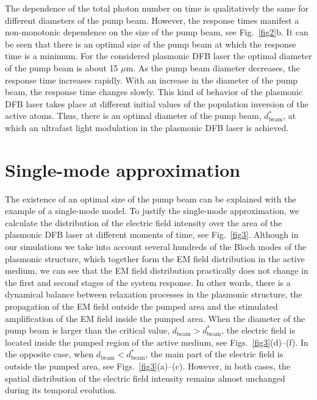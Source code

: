 \documentclass[aps,pra,amsmath,amssymb,onecolumn,superscriptaddress,showpacs,floatfix,]{revtex4-1}
\begin{document}
The dependence of the total photon number on time is qualitatively the same for different diameters of the pump beam.
However, the response times manifest a non-monotonic dependence on the size of the pump beam, see Fig.~\ref{fig2}b.
It can be seen that there is an optimal size of the pump beam at which the response time is a minimum.
For the considered plasmonic DFB laser the optimal diameter of the pump beam is about 15 $\mu$m.
As the pump beam diameter decreases, the response time increases rapidly.
With an increase in the diameter of the pump beam, the response time changes slowly.
This kind of behavior of the plasmonic DFB laser takes place at different initial values of the population inversion of the active atoms.
Thus, there is an optimal diameter of the pump beam, $d_{\text{beam}}^*$, at which an ultrafast light modulation in the plasmonic DFB laser is achieved.

\section*{Single-mode approximation}

The existence of an optimal size of the pump beam can be explained with the example of a single-mode model. To justify the single-mode approximation, we calculate the distribution of the electric field intensity over the area of the plasmonic DFB laser at different moments of time, see Fig.~\ref{fig3}.
Although in our simulations we take into account several hundreds of the Bloch modes of the plasmonic structure, which together form the EM field distribution in the active medium, we can see that the EM field distribution practically does not change in the first and second stages of the system response. In other words, there is a dynamical balance between relaxation processes in the plasmonic structure, the propagation of the EM field outside the pumped area and the stimulated amplification of the EM field inside the pumped area. When the diameter of the pump beam is larger than the critical value, $d_{\text{beam}} > d_{\text{beam}}^*$, the electric field is located inside the pumped region of the active medium, see Figs.~\ref{fig3}(d)--(f).
In the opposite case, when $d_{\text{beam}} < d_{\text{beam}}^*$, the main part of the electric field is outside the pumped area, see Figs.~\ref{fig3}(a)--(c).
However, in both cases, the spatial distribution of the electric field intensity remains almost unchanged during its temporal evolution. 
\end{document}
